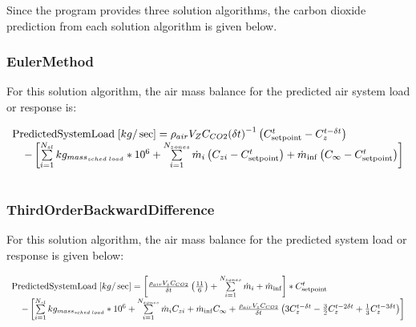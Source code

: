Since the program provides three solution algorithms, the carbon dioxide prediction from each solution algorithm is given below.

\subsubsection{EulerMethod}\label{eulermethod}

For this solution algorithm, the air mass balance for the predicted air system load or response is:

\begin{equation}
\begin{array}{l}{\rm{PredictedSystemLoad}}\;[kg/\sec ] = {\rho_{air}}{V_Z}{C_{CO2}}{\left( {\delta t} \right)^{ - 1}}\left( {C_{{\rm{setpoint}}}^t - C_z^{t - \delta t}} \right)\\\;\;\;\; - \left[ {\sum\limits_{i = 1}^{{N_{sl}}} {k{g_{mas{s_{sched\;load}}}}} *{{10}^6} + \sum\limits_{i = 1}^{{N_{zones}}} {{{\dot m}_i}} \left( {{C_{zi}} - C_{{\rm{setpoint}}}^t} \right) + {{\dot m}_{\inf }}\left( {{C_\infty } - C_{{\rm{setpoint}}}^t} \right)} \right]\\\;\;\;\;\;\;\;\;\;\;\;\;\;\;\;\;\;\;\;\;\;\;\;\;\;\;\;\;\;\;\;\;\;\;\;\end{array}
\end{equation}

\subsubsection{ThirdOrderBackwardDifference}\label{thirdorderbackwarddifference}

For this solution algorithm, the air mass balance for the predicted system load or response is given below:

\begin{equation}
\begin{array}{l}{\rm{PredictedSystemLoad}}\;[kg/\sec ] = \left[ {\frac{{{\rho_{air}}{V_z}{C_{CO2}}}}{{\delta t}}\left( {\frac{{11}}{6}} \right) + \sum\limits_{i = 1}^{{N_{zones}}} {{{\dot m}_i}}  + {{\dot m}_{\inf }}} \right]*C_{{\rm{setpoint}}}^t\\\;\;\;\; - \left[ {\sum\limits_{i = 1}^{{N_{sl}}} {k{g_{mas{s_{sched\;load}}}}*{{10}^6}}  + \sum\limits_{i = 1}^{{N_{zones}}} {{{\dot m}_i}} {C_{zi}} + {{\dot m}_{\inf }}{C_\infty } + \frac{{{\rho_{air}}{V_z}{C_{CO2}}}}{{\delta t}}\left( {3C_z^{t - \delta t} - \frac{3}{2}C_z^{t - 2\delta t} + \frac{1}{3}C_z^{t - 3\delta t}} \right)} \right]\\\;\;\;\;\;\;\;\;\;\;\;\;\;\;\;\;\;\;\;\;\;\;\;\;\;\;\;\;\;\;\;\;\;\;\;\end{array}
\end{equation}

